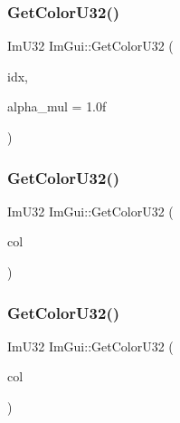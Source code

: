 \hypertarget{namespace_im_gui_a0de2d9bd347d9866511eb8d014e62556}{}\label{namespace_im_gui_a0de2d9bd347d9866511eb8d014e62556} 
\subsubsection{\texorpdfstring{Get\+Color\+U32()}{GetColorU32()}\hspace{0.1cm}{\footnotesize\ttfamily [1/3]}}
{\footnotesize\ttfamily Im\+U32 Im\+Gui\+::\+Get\+Color\+U32 (\begin{DoxyParamCaption}\item[{Im\+Gui\+Col}]{idx,  }\item[{float}]{alpha\+\_\+mul = {\ttfamily 1.0f} }\end{DoxyParamCaption})}

\hypertarget{namespace_im_gui_ac701752365ddd58cecc1956fc62921a8}{}\label{namespace_im_gui_ac701752365ddd58cecc1956fc62921a8} 
\subsubsection{\texorpdfstring{Get\+Color\+U32()}{GetColorU32()}\hspace{0.1cm}{\footnotesize\ttfamily [2/3]}}
{\footnotesize\ttfamily Im\+U32 Im\+Gui\+::\+Get\+Color\+U32 (\begin{DoxyParamCaption}\item[{const \hyperlink{struct_im_vec4}{Im\+Vec4} \&}]{col }\end{DoxyParamCaption})}

\hypertarget{namespace_im_gui_a834649713437e8fdfa0e5a4fb780d35b}{}\label{namespace_im_gui_a834649713437e8fdfa0e5a4fb780d35b} 
\subsubsection{\texorpdfstring{Get\+Color\+U32()}{GetColorU32()}\hspace{0.1cm}{\footnotesize\ttfamily [3/3]}}
{\footnotesize\ttfamily Im\+U32 Im\+Gui\+::\+Get\+Color\+U32 (\begin{DoxyParamCaption}\item[{Im\+U32}]{col }\end{DoxyParamCaption})}

